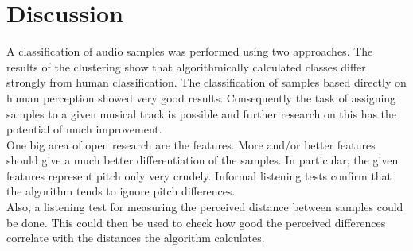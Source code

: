 \section{Discussion}
A classification of audio samples was performed using two approaches. The results of the clustering show that algorithmically calculated classes differ strongly from human classification. The classification of samples based directly on human perception showed very good results. Consequently the task of assigning samples to a given musical track is possible and further research on this has the potential of much improvement.\\
One big area of open research are the features. More and/or better features should give a much better differentiation of the samples. In particular, the given features represent pitch only very crudely. Informal listening tests confirm that the algorithm tends to ignore pitch differences.\\
Also, a listening test for measuring the perceived distance between samples could be done. This could then be used to check how good the perceived differences correlate with the distances the algorithm calculates.